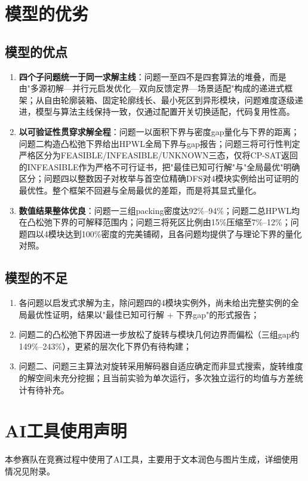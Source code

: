 \documentclass{JXUSTmodeling}
\begin{document}
\section{模型的优劣}\label{sec:6}
\subsection{模型的优点}
\begin{enumerate}
	\item \textbf{四个子问题统一于同一求解主线}：问题一至四不是四套算法的堆叠，而是由"多源初解—并行元启发优化—双向反馈定界—场景适配"构成的递进式框架；从自由轮廓装箱、固定轮廓线长、最小死区到异形模块，问题难度逐级递进，模型与算法主线保持一致，仅通过配置开关切换适配，代码复用性高。
	\item \textbf{以可验证性贯穿求解全程}：问题一以面积下界与密度gap量化与下界的距离；问题二构造凸松弛下界给出HPWL全局下界与gap报告；问题三将可行性判定严格区分为FEASIBLE/INFEASIBLE/UNKNOWN三态，仅将CP-SAT返回的INFEASIBLE作为严格不可行证书，把"最佳已知可行解"与"全局最优"明确区分；问题四以整数因子对枚举与首空位精确DFS对4模块实例给出可证明的最优性。整个框架不回避与全局最优的差距，而是将其显式量化。
	\item \textbf{数值结果整体优良}：问题一三组packing密度达92\%--94\%；问题二总HPWL均在凸松弛下界的可解释范围内；问题三将死区比例由15\%压缩至7\%--12\%；问题四以4模块达到100\%密度的完美铺砌，且各问题均提供了与理论下界的量化对照。
\end{enumerate}

\subsection{模型的不足}
\begin{enumerate}
	\item 各问题以启发式求解为主，除问题四的4模块实例外，尚未给出完整实例的全局最优性证明，结果以"最佳已知可行解 + 下界gap"的形式报告；
	\item 问题二的凸松弛下界因进一步放松了旋转与模块几何边界而偏松（三组gap约149\%--243\%），更紧的层次化下界仍有待构建；
	\item 问题二、问题三主算法对旋转采用解码器自适应确定而非显式搜索，旋转维度的解空间未充分挖掘；且当前实验为单次运行，多次独立运行的均值与方差统计有待补充。
\end{enumerate}

\section{AI工具使用声明}
本参赛队在竞赛过程中使用了AI工具，主要用于文本润色与图片生成，详细使用情况见附录。
\end{document}
